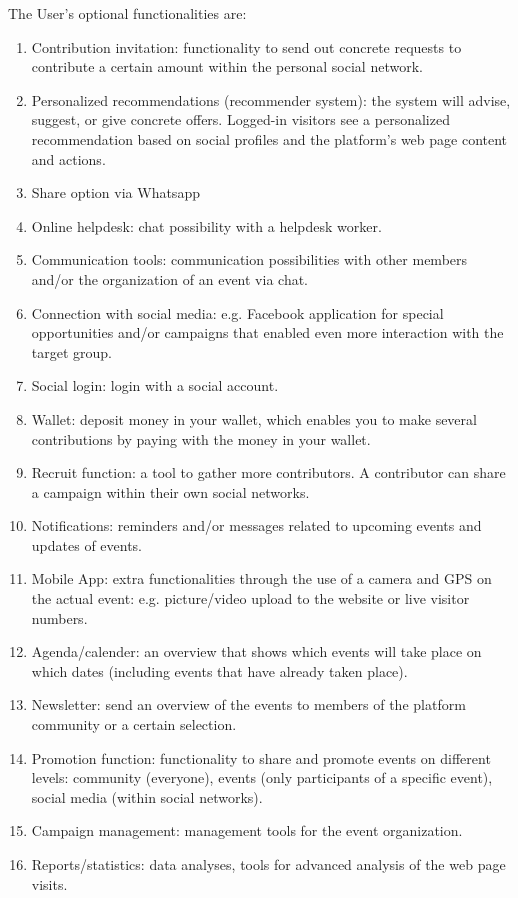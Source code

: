 The User’s optional functionalities are:

\begin{enumerate}
      \item
          Contribution invitation: functionality to send out concrete requests to contribute a certain amount
          within the personal social network.
    \item
          Personalized recommendations (recommender system): the system will advise, suggest, or give concrete offers. Logged-in visitors see a personalized recommendation based on social profiles and the
          platform’s web page content and actions.
    \item
          Share option via Whatsapp
    \item
          Online helpdesk: chat possibility with a helpdesk worker.
    \item
          Communication tools: communication possibilities with other members and/or the organization of an
          event via chat.
    \item
          Connection with social media: e.g. Facebook application for special opportunities and/or campaigns
          that enabled even more interaction with the target group.
    \item
          Social login: login with a social account.
    \item
          Wallet: deposit money in your wallet, which enables you to make several contributions by
          paying with the money in your wallet.
    \item
          Recruit function: a tool to gather more contributors. A contributor can share a campaign within their
          own social networks.
    \item
          Notifications: reminders and/or messages related to upcoming events and updates of events.
    \item
          Mobile App: extra functionalities through the use of a camera and GPS on the actual event: e.g. picture/video upload to the website or live visitor numbers.

    \item
          Agenda/calender: an overview that shows which events will take place on which dates (including events
          that have already taken place).
    \item
          Newsletter: send an overview of the events to members of the platform community or a certain
          selection.
    \item
          Promotion function: functionality to share and promote events on different levels: community (everyone), events (only participants of a specific event), social media (within social networks).
    \item
          Campaign management: management tools for the event organization.
    \item
          Reports/statistics: data analyses, tools for advanced analysis of the web page visits.
\end{enumerate}




